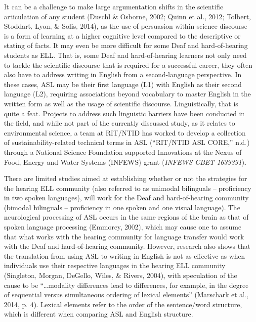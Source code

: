 \documentclass[11.5pt]{sig-alternate} %
\begin{document}
\begin{large}
It can be a challenge to make large argumentation shifts in the scientific articulation of any student (Duschl \& Osborne, 2002; Quinn et al., 2012; Tolbert, Stoddart, Lyon, \& Solis, 2014), as the use of persuasion within science discourse is a form of learning at a higher cognitive level compared to the descriptive or stating of facts. It may even be more difficult for some Deaf and hard-of-hearing students as ELL. That is, some Deaf and hard-of-hearing learners not only need to tackle the scientific discourse that is required for a successful career, they often also have to address writing in English from a second-language perspective. In these cases, ASL may be their first language (L1) with English as their second language (L2), requiring associations beyond vocabulary to master English in the written form as well as the usage of scientific discourse. Linguistically, that is quite a feat. Projects to address such linguistic barriers have been conducted in the field, and while not part of the currently discussed study, as it relates to environmental science, a team at RIT/NTID has worked to develop a collection of sustainability-related technical terms in ASL (“RIT/NTID ASL CORE,” n.d.) through a National Science Foundation supported Innovations at the Nexus of Food, Energy and Water Systems (INFEWS) grant (\textit{INFEWS CBET-1639391}).

There are limited studies aimed at establishing whether or not the strategies for the hearing ELL community (also referred to as unimodal bilinguals – proficiency in two spoken languages), will work for the Deaf and hard-of-hearing community (bimodal bilinguals – proficiency in one spoken and one visual language). The neurological processing of ASL occurs in the same regions of the brain as that of spoken language processing (Emmorey, 2002), which may cause one to assume that what works with the hearing community for language transfer would work with the Deaf and hard-of-hearing community. However, research also shows that the translation from using ASL to writing in English is not as effective as when individuals use their respective languages in the hearing ELL community (Singleton, Morgan, DeGello, Wiles, \& Rivers, 2004), with speculation of the cause to be “…modality differences lead to differences, for example, in the degree of sequential versus simultaneous ordering of lexical elements” (Marschark et al., 2014, p. 4). Lexical elements refer to the order of the sentence/word structure, which is different when comparing ASL and English structure. 


\end{large}
\end{document}
